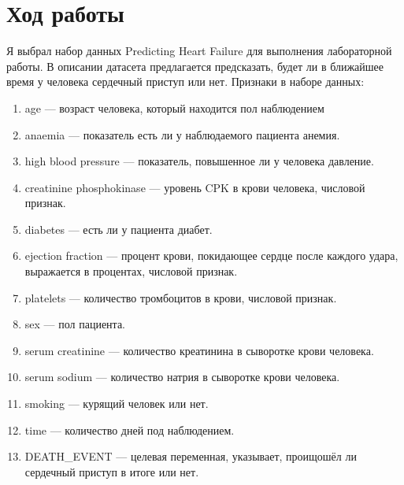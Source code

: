\graphicspath{{images/}}

\section{Ход работы}

Я выбрал набор данных Predicting Heart Failure \cite{kaggle} для выполнения лабораторной работы. В описании датасета предлагается
предсказать, будет ли в ближайшее время у человека сердечный приступ или нет.
Признаки в наборе данных:

\begin{enumerate}
    \item
    age --- возраст человека, который находится пол наблюдением
    \item
    anaemia --- показатель есть ли у наблюдаемого пациента анемия.
    \item
    high blood pressure --- показатель, повышенное ли у человека давление.
    \item
    creatinine phosphokinase --- уровень CPK в крови человека, числовой признак.
    \item
    diabetes --- есть ли у пациента диабет.
    \item
    ejection fraction --- процент крови, покидающее сердце после каждого удара, выражается в процентах, числовой признак.
    \item
    platelets --- количество тромбоцитов в крови, числовой признак.
    \item
    sex --- пол пациента.
    \item
    serum creatinine --- количество креатинина в сыворотке крови человека.
    \item
    serum sodium --- количество натрия в сыворотке крови человека.
    \item
    smoking --- курящий человек или нет.
    \item
    time --- количество дней под наблюдением.
    \item
    DEATH\_EVENT --- целевая переменная, указывает, проищошёл ли сердечный приступ в итоге или нет.
\end{enumerate}

